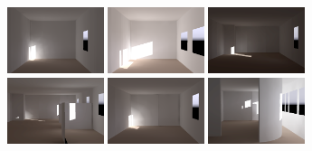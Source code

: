 \begin{figure}[t]
\includegraphics[width=1.11in]{../gi2012_userstudy/images/renderings/renovations/065_camera_dark_december_crop.png} %
\includegraphics[width=1.11in]{../gi2012_userstudy/images/renderings/renovations/065_camera_dark_december_mod_crop.png} %
\hfill
\includegraphics[width=1.11in]{images/renovations/PRE_N6_dec_dark.png}
\includegraphics[width=1.11in]{images/renovations/N6_dec_dark.png} 
\hfill
\includegraphics[width=1.11in]{../gi2012_userstudy/images/renderings/renovations/042_camera_dark_december_crop.png} %
\includegraphics[width=1.11in]{images/renovations/A3_dec_dark.png}

\vspace{-1.9in}
\begin{minipage}{1.11in}~{\color{white}{\bf A1 original}}\end{minipage} 
\begin{minipage}{1.11in}~{\color{white}{\bf A1 renovation}}\end{minipage}
\hfill
\begin{minipage}{1.11in}~{\color{white}{\bf N6 original}}\end{minipage} 
\begin{minipage}{1.11in}~{\color{white}{\bf N6 renovation}}\end{minipage} 
\hfill
\begin{minipage}{1.08in}~{\color{white}{\bf A3 original}}\end{minipage} 
\begin{minipage}{1.08in}~{\color{white}{\bf A3 renovation}}\end{minipage}


\end{figure}
